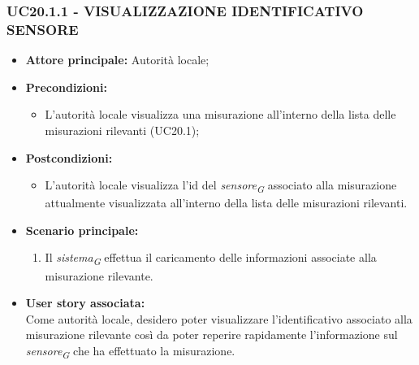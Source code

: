\subsubsection{UC20.1.1 - VISUALIZZAZIONE IDENTIFICATIVO SENSORE}
\begin{itemize}
      \item \textbf{Attore principale:} Autorità locale;
      \item \textbf{Precondizioni:}
            \begin{itemize}
                  \item L'autorità locale visualizza una misurazione all'interno della lista delle misurazioni rilevanti (UC20.1);
            \end{itemize}
      \item \textbf{Postcondizioni:}
            \begin{itemize}
                \item L'autorità locale visualizza l'id del \textit{sensore}\textsubscript{\textit{G}} associato alla misurazione attualmente visualizzata all'interno della lista delle misurazioni rilevanti.
            \end{itemize}
      \item \textbf{Scenario principale:}
            \begin{enumerate}
                \item Il \textit{sistema}\textsubscript{\textit{G}} effettua il caricamento delle informazioni associate alla misurazione rilevante.
            \end{enumerate}
      \item \textbf{User story associata:} \\
      Come autorità locale, desidero poter visualizzare l'identificativo associato alla misurazione rilevante così da poter reperire rapidamente l'informazione sul \textit{sensore}\textsubscript{\textit{G}} che ha effettuato la misurazione.
\end{itemize}